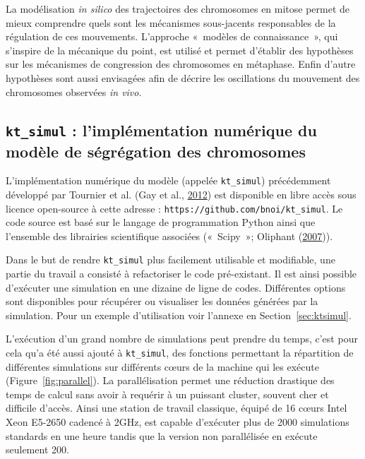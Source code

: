\documentclass[12pt,a4paper,twoside,openright]{book}
\begin{document}
La modélisation \emph{in silico} des trajectoires des chromosomes en
mitose permet de mieux comprendre quels sont les mécanismes sous-jacents
responsables de la régulation de ces mouvements. L'approche «~modèles de
connaissance~», qui s'inspire de la mécanique du point, est utilisé et
permet d'établir des hypothèses sur les mécanismes de congression des
chromosomes en métaphase. Enfin d'autre hypothèses sont aussi envisagées
afin de décrire les oscillations du mouvement des chromosomes observées
\emph{in vivo}.

\subsection{\texorpdfstring{\texttt{kt\_simul} : l'implémentation
numérique du modèle de ségrégation des
chromosomes}{kt\_simul : l'implémentation numérique du modèle de ségrégation des chromosomes}}\label{ktux5fsimul-limpluxe9mentation-numuxe9rique-du-moduxe8le-de-suxe9gruxe9gation-des-chromosomes}

L'implémentation numérique du modèle (appelée \texttt{kt\_simul})
précédemment développé par Tournier et al. (Gay et al.,
\protect\hyperlink{ref-Gay2012a}{2012}) est disponible en libre accès
sous licence open-source à cette adresse :
\texttt{https://github.com/bnoi/kt\_simul}. Le code source est basé sur
le langage de programmation Python ainsi que l'ensemble des librairies
scientifique associées («~Scipy~»; Oliphant
(\protect\hyperlink{ref-Oliphant2007}{2007})).

Dans le but de rendre \texttt{kt\_simul} plus facilement utilisable et
modifiable, une partie du travail a consisté à refactoriser le code
pré-existant. Il est ainsi possible d'exécuter une simulation en une
dizaine de ligne de codes. Différentes options sont disponibles pour
récupérer ou visualiser les données générées par la simulation. Pour un
exemple d'utilisation voir l'annexe en Section~\ref{sec:ktsimul}.

L'exécution d'un grand nombre de simulations peut prendre du temps,
c'est pour cela qu'a été aussi ajouté à \texttt{kt\_simul}, des
fonctions permettant la répartition de différentes simulations sur
différents cœurs de la machine qui les exécute
(Figure~\ref{fig:parallel}). La parallélisation permet une réduction
drastique des temps de calcul sans avoir à requérir à un puissant
cluster, souvent cher et difficile d'accès. Ainsi une station de travail
classique, équipé de 16 cœurs Intel Xeon E5-2650 cadencé à 2GHz, est
capable d'exécuter plus de 2000 simulations standards en une heure
tandis que la version non parallélisée en exécute seulement 200.
\end{document}
